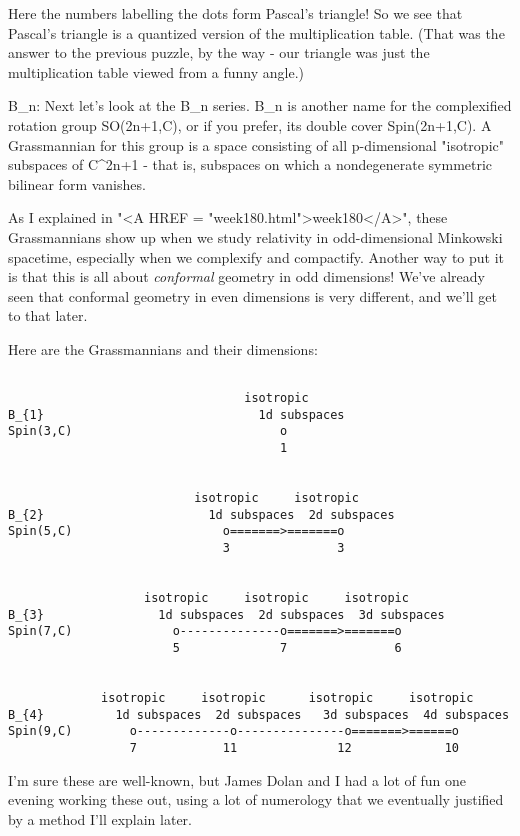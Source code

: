 Here the numbers labelling the dots form Pascal's triangle!    So we 
see that Pascal's triangle is a quantized version of the multiplication
table.  (That was the answer to the previous puzzle, by the way - our
triangle was just the multiplication table viewed from a funny angle.)

B_{n}: Next let's look at the B_{n} series.  B_{n} is another name for the
complexified rotation group SO(2n+1,C), or if you prefer, its double
cover Spin(2n+1,C).  A Grassmannian for this group is a space consisting
of all p-dimensional "isotropic" subspaces of C^{2n+1} - that is,
subspaces on which a nondegenerate symmetric bilinear form vanishes.

As I explained in "<A HREF = "week180.html">week180</A>",
these Grassmannians show up when we study relativity in odd-dimensional
Minkowski spacetime, especially when we complexify and compactify.
Another way to put it is that this is all about \emph{conformal}
geometry in odd dimensions!  We've already seen that conformal geometry
in even dimensions is very different, and we'll get to that later.

Here are the Grassmannians and their dimensions:



\begin{verbatim}

                                 isotropic 
B_{1}                              1d subspaces
Spin(3,C)                             o
                                      1

     
                          isotropic     isotropic          
B_{2}                       1d subspaces  2d subspaces
Spin(5,C)                     o=======>=======o
                              3               3


                   isotropic     isotropic     isotropic
B_{3}                1d subspaces  2d subspaces  3d subspaces
Spin(7,C)              o--------------o=======>=======o
                       5              7               6


             isotropic     isotropic      isotropic     isotropic
B_{4}          1d subspaces  2d subspaces   3d subspaces  4d subspaces
Spin(9,C)        o-------------o---------------o=======>======o
                 7            11              12             10 
\end{verbatim}
    
I'm sure these are well-known, but James Dolan and I had a lot of 
fun one evening working these out, using a lot of numerology that we
eventually justified by a method I'll explain later.

